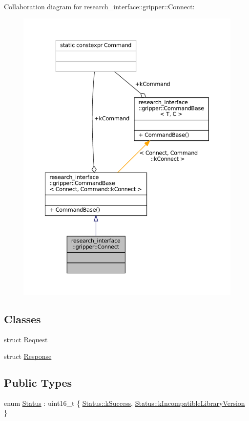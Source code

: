 Collaboration diagram for research\+\_\+interface\+:\+:gripper\+:\+:Connect\+:
\nopagebreak
\begin{figure}[H]
\begin{center}
\leavevmode
\includegraphics[width=350pt]{structresearch__interface_1_1gripper_1_1Connect__coll__graph}
\end{center}
\end{figure}
\subsection*{Classes}
\begin{DoxyCompactItemize}
\item 
struct \hyperlink{structresearch__interface_1_1gripper_1_1Connect_1_1Request}{Request}
\item 
struct \hyperlink{structresearch__interface_1_1gripper_1_1Connect_1_1Response}{Response}
\end{DoxyCompactItemize}
\subsection*{Public Types}
\begin{DoxyCompactItemize}
\item 
enum \hyperlink{structresearch__interface_1_1gripper_1_1Connect_a814cff5ea860c080fe3f1f127a6d20e2}{Status} \+: uint16\+\_\+t \{ \hyperlink{structresearch__interface_1_1gripper_1_1Connect_a814cff5ea860c080fe3f1f127a6d20e2a8c632159fa131f09d04f94e3cbcd8782}{Status\+::k\+Success}, 
\hyperlink{structresearch__interface_1_1gripper_1_1Connect_a814cff5ea860c080fe3f1f127a6d20e2a76c46964a75e7749a84b1275e5a0d6a2}{Status\+::k\+Incompatible\+Library\+Version}
 \}
\end{DoxyCompactItemize}

